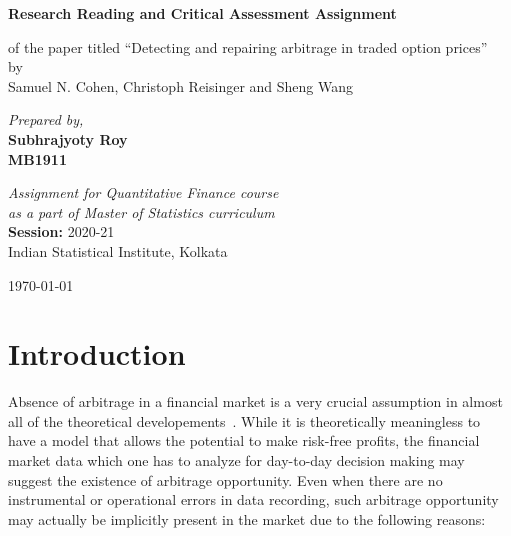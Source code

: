 \documentclass[12pt]{article}
\begin{document}
\begin{titlepage}
    \begin{center}
        \vspace*{5cm}
 
        \Huge{\textbf{Research Reading and Critical Assessment Assignment}}
 
        \vspace{0.5cm}
        \large{of the paper titled ``Detecting and repairing arbitrage in traded option prices''}\\
        \large{by}\\
        \large{Samuel N. Cohen, Christoph Reisinger and Sheng Wang}
             
        \vspace{1.5cm}
 
        \large{\textit{Prepared by,}}\\
        \large{\textbf{Subhrajyoty Roy}}\\
        \large{\textbf{MB1911}}
 
        \vspace{2cm}
             
        \textit{Assignment for Quantitative Finance course\\
        as a part of Master of Statistics curriculum}\\
        \vspace{0.5cm}
        \textbf{Session: } 2020-21\\
        Indian Statistical Institute, Kolkata

        \vfill
        
        \begin{flushright}
            \normalsize{\today}            
        \end{flushright}
    \end{center}
\end{titlepage}


\section{Introduction}

Absence of arbitrage in a financial market is a very crucial assumption in almost all of the theoretical developements~\cite{hull2003options,pliska1997introduction,ross2011elementary}. While it is theoretically meaningless to have a model that allows the potential to make risk-free profits, the financial market data which one has to analyze for day-to-day decision making may suggest the existence of arbitrage opportunity. Even when there are no instrumental or operational errors in data recording, such arbitrage opportunity may actually be implicitly present in the market due to the following reasons:
\end{document}
